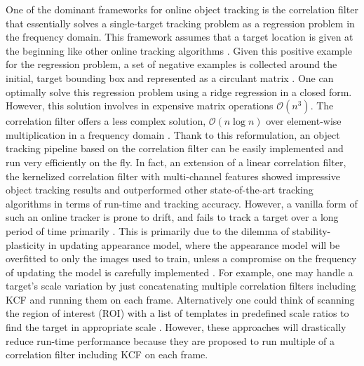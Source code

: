 \documentclass{bmvc2k}
\begin{document}
One of the dominant frameworks for online object tracking is the
correlation filter that essentially solves a single-target tracking
problem as a regression problem in the frequency domain. This
framework assumes that a target location is given at the beginning
like other online tracking algorithms
\cite{smeulders2014survey}. Given this positive example for the
regression problem, a set of negative examples is collected around the
initial, target bounding box and represented as a circulant matrix
\cite{henriques2015high}. One can optimally solve this regression
problem using a ridge regression in a closed form. However, this
solution involves in expensive matrix operations
$\mathcal{O}(n^{3})$. The correlation filter offers a less complex
solution, $\mathcal{O}(n\log n)$ over element-wise multiplication in a
frequency domain \cite{bolme2010visual,henriques2015high}. Thank to
this reformulation, an object tracking pipeline based on the
correlation filter can be easily implemented and run very efficiently
on the fly. In fact, an extension of a linear correlation filter, the
kernelized correlation filter with multi-channel features
\cite{henriques2015high} showed impressive object tracking results and
outperformed other state-of-the-art tracking algorithms in terms of
run-time and tracking accuracy. However, a vanilla form of such an
online tracker is prone to drift, and fails to track a target over a
long period of time primarily \cite{henriques2015high}. This is
primarily due to the dilemma of stability-plasticity in updating
appearance model, where the appearance model will be overfitted to
only the images used to train, unless a compromise on the frequency of
updating the model is carefully implemented
\cite{santner2010prost}. For example, one may handle a target's scale
variation by just concatenating multiple correlation filters including
KCF and running them on each frame. Alternatively one could think of
scanning the region of interest (ROI) with a list of templates in
predefined scale ratios to find the target in appropriate scale
\cite{henriques2015high,tang2015multi,ma2015long,bibi2015multi,li2014scale}. However,
these approaches will drastically reduce run-time performance because
they are proposed to run multiple of a correlation filter including
KCF on each frame.
\end{document}

